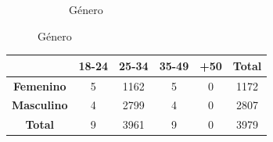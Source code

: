 \documentclass{beamer}
\begin{document}
\begin{frame}
\begin{figure}[H]
\begin{subfigure}{0.3\textwidth}
			\caption{Género}
			\label{subfig:blm/resultados-genero-moda}
		\end{subfigure}
	\end{figure}
	\begin{table}[H]
		\centering
		{
			\setlength{\tabcolsep}{0.6\tabcolsep}
			\begin{tabular}{|c|c|c|c|c|c|}
				\hline
				\diagbox{\textbf{Género}}{\textbf{Edad}} & \textbf{18-24} & \textbf{25-34} & \textbf{35-49} & \textbf{+50} & \textbf{Total} \\ \hline
				\textbf{Femenino} & 5 & 1162 & 5 & 0 & 1172 \\ \hline
				\textbf{Masculino} & 4 & 2799 & 4 & 0 & 2807 \\ \hline
				\textbf{Total} & 9 & 3961 & 9 & 0 & 3979 \\ \hline
				
			\end{tabular}%
		}
	\end{table}
\end{frame}
\end{document}
